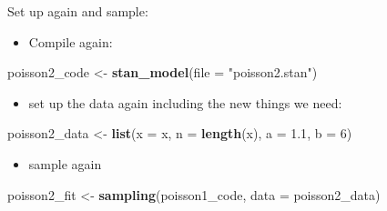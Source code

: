 \documentclass[
  ignorenonframetext,
]{beamer}
\newenvironment{Shaded}{\begin{snugshade}}{\end{snugshade}}
\newcommand{\DataTypeTok}[1]{\textcolor[rgb]{0.13,0.29,0.53}{#1}}
\newcommand{\DecValTok}[1]{\textcolor[rgb]{0.00,0.00,0.81}{#1}}
\newcommand{\FloatTok}[1]{\textcolor[rgb]{0.00,0.00,0.81}{#1}}
\newcommand{\KeywordTok}[1]{\textcolor[rgb]{0.13,0.29,0.53}{\textbf{#1}}}
\newcommand{\NormalTok}[1]{#1}
\newcommand{\StringTok}[1]{\textcolor[rgb]{0.31,0.60,0.02}{#1}}
\providecommand{\tightlist}{%
  \setlength{\itemsep}{0pt}\setlength{\parskip}{0pt}}
\begin{document}
\begin{frame}[fragile]{Set up again and sample:}
\protect\hypertarget{set-up-again-and-sample}{}

\begin{itemize}
\tightlist
\item
  Compile again:
\end{itemize}

\begin{Shaded}
\begin{Highlighting}[]
\NormalTok{poisson2_code <-}\StringTok{ }\KeywordTok{stan_model}\NormalTok{(}\DataTypeTok{file =} \StringTok{"poisson2.stan"}\NormalTok{)}
\end{Highlighting}
\end{Shaded}

\begin{itemize}
\tightlist
\item
  set up the data again including the new things we need:
\end{itemize}

\begin{Shaded}
\begin{Highlighting}[]
\NormalTok{poisson2_data <-}\StringTok{ }\KeywordTok{list}\NormalTok{(}\DataTypeTok{x =}\NormalTok{ x, }\DataTypeTok{n =} \KeywordTok{length}\NormalTok{(x), }\DataTypeTok{a =} \FloatTok{1.1}\NormalTok{, }\DataTypeTok{b =} \DecValTok{6}\NormalTok{)}
\end{Highlighting}
\end{Shaded}

\begin{itemize}
\tightlist
\item
  sample again
\end{itemize}

\begin{Shaded}
\begin{Highlighting}[]
\NormalTok{poisson2_fit <-}\StringTok{ }\KeywordTok{sampling}\NormalTok{(poisson1_code, }\DataTypeTok{data =}\NormalTok{ poisson2_data)}
\end{Highlighting}
\end{Shaded}

\end{frame}
\end{document}
